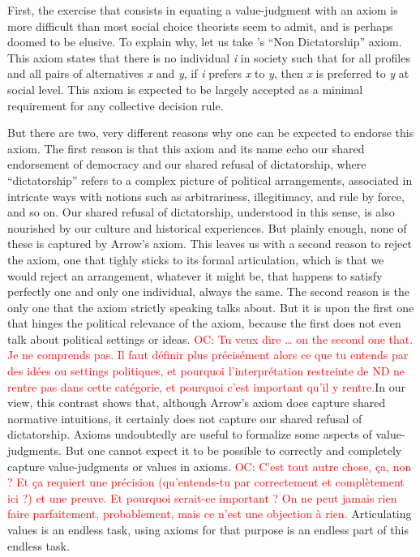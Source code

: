 \documentclass[preprint, french, english, 11pt]{elsarticle}%
\newcommand{\commentOC}[1]{\textcolor{red}{OC: #1}}
\begin{document}
First, the exercise that consists in equating a value-judgment with an axiom is more difficult than most social choice theorists seem to admit, and is perhaps doomed to be elusive. To explain why, let us take \cite{arrow_social_2012}'s “Non Dictatorship” axiom. This axiom states that there is no individual \emph{i} in society such that for all profiles and all pairs of alternatives \emph{x} and \emph{y}, if \emph{i} prefers \emph{x} to \emph{y}, then \emph{x} is preferred to \emph{y} at social level. This axiom is expected to be largely accepted as a minimal requirement for any collective decision rule.

But there are two, very different reasons why one can be expected to endorse this axiom. The first reason is that this axiom and its name echo our shared endorsement of democracy and our shared refusal of dictatorship, where ``dictatorship'' refers to a complex picture of political arrangements, associated in intricate ways with notions such as arbitrariness, illegitimacy, and rule by force, and so on. Our shared refusal of dictatorship, understood in this sense, is also nourished by our culture and historical experiences. But plainly enough, none of these is captured by Arrow's axiom. This leaves us with a second reason to reject the axiom, one that tighly sticks to its formal articulation, which is that we would reject an arrangement, whatever it might be, that happens to satisfy perfectly one and only one individual, always the same. The second reason is the only one that the axiom strictly speaking talks about. But it is upon the first one that hinges the political relevance of the axiom, because the first does not even talk about political settings or ideas. 
\commentOC{Tu veux dire … on the second one that. Je ne comprends pas. Il faut définir plus précisément alors ce que tu entends par des idées ou settings politiques, et pourquoi l’interprétation restreinte de ND ne rentre pas dans cette catégorie, et pourquoi c’est important qu’il y rentre.}In our view, this contrast shows that, although Arrow's axiom does capture shared normative intuitions, it certainly does not capture our shared refusal of dictatorship. Axioms undoubtedly are useful to formalize some aspects of value-judgments. But one cannot expect it to be possible to correctly and completely capture value-judgments or values in axioms. 
\commentOC{C’est tout autre chose, ça, non ? Et ça requiert une précision (qu’entends-tu par correctement et complètement ici ?) et une preuve. Et pourquoi serait-ce important ? On ne peut jamais rien faire parfaitement, probablement, mais ce n’est une objection à rien.}
Articulating values is an endless task, using axioms for that purpose is an endless part of this endless task.
\end{document}
